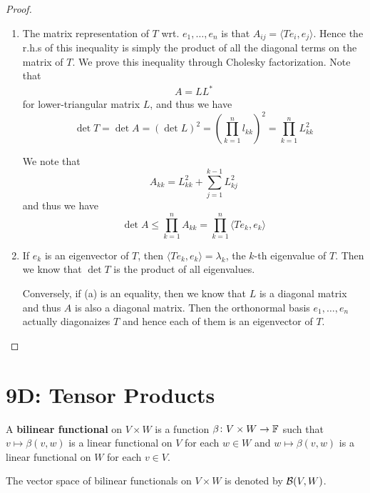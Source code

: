 \documentclass{extarticle}
\begin{document}
\begin{proof}
\begin{enumerate}[label=(\alph*)]
    \item The matrix representation of \(T\) wrt. \(e_1, \ldots, e_n\) is that 
    \(A_{ij} = \langle Te_i, e_j \rangle\). Hence the r.h.s of this inequality is simply 
    the product of all the diagonal terms on the matrix of \(T\). We prove this inequality 
    through Cholesky factorization. Note that 
    \begin{align*}
        A = L L^*
    \end{align*}
    for lower-triangular matrix \(L\), and thus we have 
    \[\det T = \det A = (\det L)^2 = \left( \prod_{k=1}^{n} l_{kk} \right)^2 = \prod_{k=1}^{n}L_{kk}^2\]

    We note that 
    \[A_{kk} = L_{kk}^2 + \sum_{j=1}^{k-1} L_{kj}^2  \]
    and thus we have 
    \[\det A \leq \prod_{k=1}^{n}A_{kk} = \prod_{k=1}^{n} \langle Te_k,e_k \rangle\]
    
    
    \item  If \(e_k\) is an eigenvector of \(T\), then \(\langle Te_k, e_k \rangle = \lambda_k\), the 
    \(k\)-th eigenvalue of \(T\). Then we know that \(\det T \) is the product of all eigenvalues. 

    Conversely, if (a) is an equality, then we know that \(L\) is a diagonal matrix and thus 
    \(A\) is also a diagonal matrix. Then the orthonormal basis \(e_1, \ldots, e_n\) actually 
    diagonaizes \(T\) and hence each of them is an eigenvector of \(T\).
\end{enumerate}
\end{proof}


\newpage 
\section*{9D: Tensor Products}

\begin{definition}
    A \textbf{bilinear functional} on \(V \times W\) is a function  \(\beta \colon V \times W \to \mathbb{F}\)
    such that \(v \mapsto \beta(v, w)\) is a linear functional on \(V\) for each \(w \in W\) and 
    \(w \mapsto \beta(v, w)\) is a linear functional on \(W\) for each \(v \in V\). 

    The vector space of bilinear functionals on \(V \times W\) is denoted by \(\mathcal{B}(V, W)\). 
\end{definition}
\end{document}
